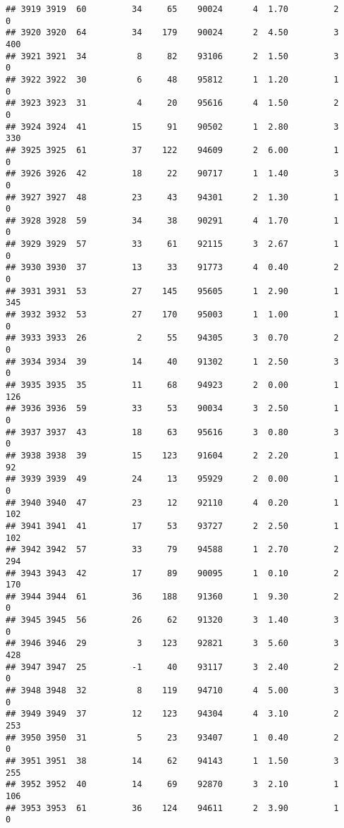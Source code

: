 \documentclass[
]{article}
\begin{document}
\begin{verbatim}
## 3919 3919  60         34     65    90024      4  1.70         2        0
## 3920 3920  64         34    179    90024      2  4.50         3      400
## 3921 3921  34          8     82    93106      2  1.50         3        0
## 3922 3922  30          6     48    95812      1  1.20         1        0
## 3923 3923  31          4     20    95616      4  1.50         2        0
## 3924 3924  41         15     91    90502      1  2.80         3      330
## 3925 3925  61         37    122    94609      2  6.00         1        0
## 3926 3926  42         18     22    90717      1  1.40         3        0
## 3927 3927  48         23     43    94301      2  1.30         1        0
## 3928 3928  59         34     38    90291      4  1.70         1        0
## 3929 3929  57         33     61    92115      3  2.67         1        0
## 3930 3930  37         13     33    91773      4  0.40         2        0
## 3931 3931  53         27    145    95605      1  2.90         1      345
## 3932 3932  53         27    170    95003      1  1.00         1        0
## 3933 3933  26          2     55    94305      3  0.70         2        0
## 3934 3934  39         14     40    91302      1  2.50         3        0
## 3935 3935  35         11     68    94923      2  0.00         1      126
## 3936 3936  59         33     53    90034      3  2.50         1        0
## 3937 3937  43         18     63    95616      3  0.80         3        0
## 3938 3938  39         15    123    91604      2  2.20         1       92
## 3939 3939  49         24     13    95929      2  0.00         1        0
## 3940 3940  47         23     12    92110      4  0.20         1      102
## 3941 3941  41         17     53    93727      2  2.50         1      102
## 3942 3942  57         33     79    94588      1  2.70         2      294
## 3943 3943  42         17     89    90095      1  0.10         2      170
## 3944 3944  61         36    188    91360      1  9.30         2        0
## 3945 3945  56         26     62    91320      3  1.40         3        0
## 3946 3946  29          3    123    92821      3  5.60         3      428
## 3947 3947  25         -1     40    93117      3  2.40         2        0
## 3948 3948  32          8    119    94710      4  5.00         3        0
## 3949 3949  37         12    123    94304      4  3.10         2      253
## 3950 3950  31          5     23    93407      1  0.40         2        0
## 3951 3951  38         14     62    94143      1  1.50         3      255
## 3952 3952  40         14     69    92870      3  2.10         1      106
## 3953 3953  61         36    124    94611      2  3.90         1        0

\end{verbatim}
\end{document}
